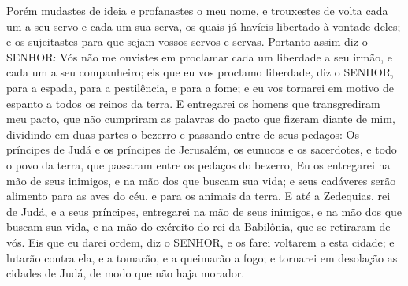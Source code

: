 {Porém mudastes de ideia e profanastes o meu nome, e trouxestes de volta cada um a seu servo e cada um sua serva, os quais já havíeis libertado à vontade deles; e os sujeitastes para que sejam vossos servos e servas.
Portanto assim diz o SENHOR: Vós não me ouvistes em proclamar cada um liberdade a seu irmão, e cada um a seu companheiro; eis que eu vos proclamo liberdade, diz o SENHOR, para a espada, para a pestilência, e para a fome; e eu vos tornarei em motivo de espanto a todos os reinos da terra.
E entregarei os homens que transgrediram meu pacto, que não cumpriram as palavras do pacto que fizeram diante de mim, dividindo em duas partes o bezerro e passando entre de seus pedaços:
Os príncipes de Judá e os príncipes de Jerusalém, os eunucos e os sacerdotes, e todo o povo da terra, que passaram entre os pedaços do bezerro,
Eu os entregarei na mão de seus inimigos, e na mão dos que buscam
{} sua vida;
 e seus cadáveres serão alimento para as aves do céu, e para os animais da terra.
E até a Zedequias, rei de Judá, e a seus príncipes, entregarei na mão de seus inimigos, e na mão dos que buscam
{} sua vida, e na mão do exército do rei da Babilônia, que se retiraram de vós.
Eis que eu darei ordem, diz o SENHOR, e os farei voltarem a esta cidade; e lutarão contra ela, e a tomarão, e a queimarão a fogo; e tornarei em desolação as cidades de Judá, de modo que não haja morador.

\par }

